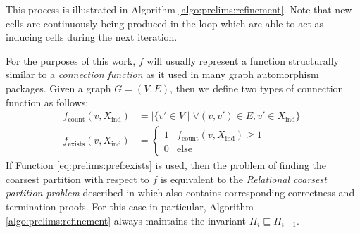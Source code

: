%
%
%
%


		This process is illustrated in Algorithm \ref{algo:prelims:refinement}. Note that new cells are continuously being produced in the loop which are able to act as inducing cells during the next iteration. 

		For the purposes of this work, $f$ will usually represent a function structurally similar to a \textit{connection function} as it used in many graph automorphism packages.
		Given a graph $G = (V, E)$, then we define two types of connection function as follows:
		\begin{align}
			f_{\mathrm{count}}(v, X_{\mathrm{ind}}) &= \left| \{ v' \in V \mid \forall (v, v') \in E, v' \in X_{\mathrm{ind}} \} \right| \label{eq:prelims:pref:count} \\
			f_{\mathrm{exists}}(v, X_{\mathrm{ind}}) &= \begin{cases}
				1 & f_{\mathrm{count}}(v, X_{\mathrm{ind}}) \geq 1 \label{eq:prelims:pref:exists} \\
				0 & \mathrm{else}
			\end{cases}
		\end{align}
		If Function \ref{eq:prelims:pref:exists} is used, then the problem of finding the coarsest partition with respect to $f$ is equivalent to the \textit{Relational coarsest partition problem} described in  \cite{paigeThreePartitionRefinement1987} which also contains corresponding correctness and termination proofs.
		For this case in particular, Algorithm \ref{algo:prelims:refinement} always maintains the invariant $\Pi_i \sqsubseteq \Pi_{i-1}$.

